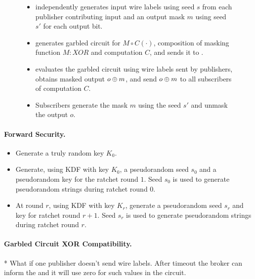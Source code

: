 \begin{figure}[h]
\begin{mdframed}[style=myframe]
\begin{itemize}[leftmargin=*]
	\item \garbler independently generates input wire labels using seed $s$ from
		each publisher contributing input and an output mask $m$ using seed $s'$
		for each output bit.

	\item \garbler generates garbled circuit for $M \circ C(\cdot)$, composition
		of masking function $M:XOR$ and computation $C$, and sends it to \broker.

	\item \broker evaluates the garbled circuit using wire labels sent by
		publishers, obtains masked output $o \oplus m$, and send $o \oplus m$ to all
		subscribers of computation $C$.
  
	\item Subscribers generate the mask $m$ using the seed $s'$ and unmask the
		output $o$.

\end{itemize}

\end{mdframed}
\end{figure}

\paragraph{Forward Security.}


\begin{itemize}[leftmargin=*]

		\item Generate a truly random key $K_0$.

		\item Generate, using KDF with key $K_0$, a pseudorandom seed $s_0$ and a
			pseudorandom key for the ratchet round $1$. Seed $s_0$ is used to
			generate pseudorandom strings during ratchet round $0$.

		\item At round $r$, using KDF with key $K_r$, generate a pseudorandom seed
			$s_r$ and key for ratchet round $r+1$. Seed $s_r$ is used to generate
			pseudorandom strings during ratchet round $r$.

\end{itemize}

\paragraph{Garbled Circuit XOR Compatibility.}


* What if one publisher doesn't send wire labels. After timeout the broker can inform the \garbler and it will use zero for such values in the circuit.
